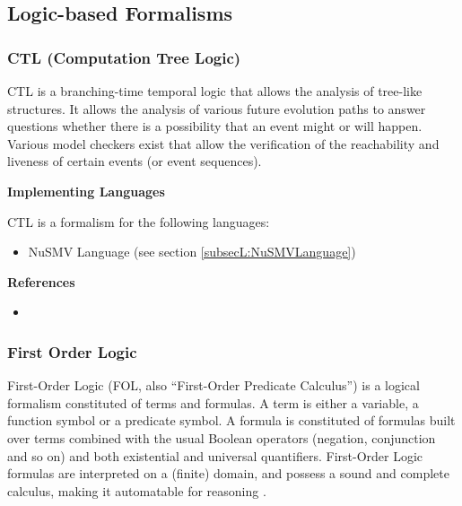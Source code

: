 \subsection{Logic-based Formalisms}

\subsubsection{CTL (Computation Tree Logic)}
\label{subsecF:CTL}


CTL is a branching-time temporal logic that allows the analysis of tree-like structures.
It allows the analysis of various future evolution paths to answer questions whether there is a possibility that an event might or will happen.
Various model checkers exist that allow the verification of the reachability and liveness of certain events (or event sequences).

\textbf{Implementing Languages}

CTL is a formalism for the following languages:
\begin{itemize}
	\item NuSMV Language (see section \ref{subsecL:NuSMVLanguage})
\end{itemize}





\textbf{References}
\begin{itemize}
	
\item {}
\end{itemize}



\subsubsection{First Order Logic}
\label{subsecF:FirstOrderLogic}


First-Order Logic (\textsc{FOL}, also ``First-Order Predicate Calculus'') is a logical formalism constituted of terms and formulas. A term is either a variable, a function symbol or a predicate symbol. A formula is constituted of formulas built over terms combined with the usual Boolean operators (negation, conjunction and so on) and both existential and universal quantifiers. First-Order Logic formulas are interpreted on a (finite) domain, and possess a sound and complete calculus, making it automatable for reasoning \cite{B:Kleene:2002}.

